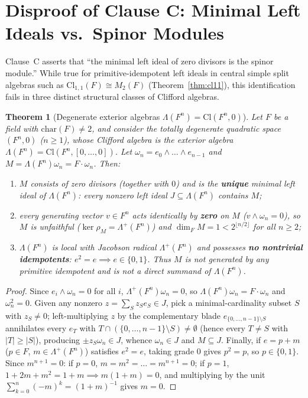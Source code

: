 \documentclass[11pt]{article}
\newtheorem{theorem}{Theorem}[section]
\theoremstyle{definition}
\newcommand{\Cl}{\mathrm{Cl}}
\begin{document}
\section{Disproof of Clause C: Minimal Left Ideals vs.\ Spinor Modules}
\label{sec:clause-c}

Clause~C asserts that ``the minimal left ideal of zero divisors is the spinor
module.'' While true for primitive-idempotent left ideals in central simple split
algebras such as $\Cl_{1,1}(F) \cong M_2(F)$ (Theorem~\ref{thm:cl11}), this
identification fails in three distinct structural classes of Clifford algebras.

\begin{theorem}[Degenerate exterior algebras $\Lambda(F^n) = \Cl(F^n, 0)$]
\label{thm:exterior}
Let $F$ be a field with $\mathrm{char}(F) \neq 2$, and consider the totally
degenerate quadratic space $(F^n, 0)$ ($n \ge 1$), whose Clifford algebra is the
exterior algebra $\Lambda(F^n) = \Cl(F^n, [0, \dots, 0])$. Let
$\omega_n = e_0 \wedge \dots \wedge e_{n-1}$ and $M = \Lambda(F^n)\omega_n = F\cdot\omega_n$.
Then:
\begin{enumerate}
  \item $M$ consists of zero divisors (together with $0$) and is the \textbf{unique}
    minimal left ideal of $\Lambda(F^n)$: every nonzero left ideal $J \subseteq \Lambda(F^n)$
    contains $M$;
  \item every generating vector $v \in F^n$ acts identically by \textbf{zero} on $M$
    ($v \wedge \omega_n = 0$), so $M$ is unfaithful ($\ker\rho_M = \Lambda^+(F^n)$)
    and $\dim_F M = 1 < 2^{\lfloor n/2\rfloor}$ for all $n \ge 2$;
  \item $\Lambda(F^n)$ is local with Jacobson radical $\Lambda^+(F^n)$ and possesses
    \textbf{no nontrivial idempotents}: $e^2 = e \implies e \in \{0, 1\}$. Thus $M$
    is not generated by any primitive idempotent and is not a direct summand of
    $\Lambda(F^n)$.
\end{enumerate}
\end{theorem}
\begin{proof}
Since $e_i \wedge \omega_n = 0$ for all $i$, $\Lambda^+(F^n)\omega_n = 0$, so
$\Lambda(F^n)\omega_n = F\cdot\omega_n$ and $\omega_n^2 = 0$. Given any nonzero
$z = \sum_S z_S e_S \in J$, pick a minimal-cardinality subset $S$ with $z_S \neq 0$;
left-multiplying $z$ by the complementary blade $e_{\{0,\dots,n-1\}\setminus S}$
annihilates every $e_T$ with $T \cap (\{0,\dots,n-1\}\setminus S) \neq \emptyset$
(hence every $T \neq S$ with $|T| \ge |S|$), producing $\pm z_S \omega_n \in J$,
whence $\omega_n \in J$ and $M \subseteq J$. Finally, if $e = p + m$ ($p \in F$,
$m \in \Lambda^+(F^n)$) satisfies $e^2 = e$, taking grade $0$ gives $p^2 = p$, so
$p \in \{0, 1\}$. Since $m^{n+1} = 0$: if $p = 0$, $m = m^2 = \dots = m^{n+1} = 0$;
if $p = 1$, $1 + 2m + m^2 = 1 + m \implies m(1 + m) = 0$, and multiplying by the
unit $\sum_{k=0}^n (-m)^k = (1 + m)^{-1}$ gives $m = 0$.
\end{proof}
\end{document}
